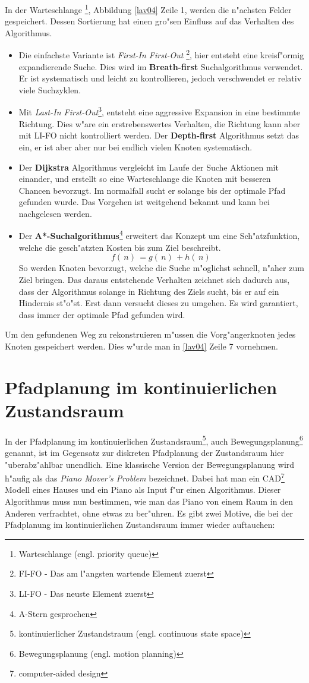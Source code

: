 In der Warteschlange \footnote{Warteschlange (engl. priority queue)}, Abbildung \ref{lav04} Zeile 1, werden die n"achsten Felder gespeichert. Dessen Sortierung hat einen gro"sen Einfluss auf das Verhalten des Algorithmus. 
	\begin{itemize}
		\item Die einfachste Variante ist \textit{First-In First-Out} \footnote{FI-FO - Das am l"angsten wartende Element zuerst}, hier entsteht eine kreisf"ormig expandierende Suche. Dies wird im \textbf{Breath-first} Suchalgorithmus verwendet. Er ist systematisch und leicht zu kontrollieren, jedoch verschwendet er relativ viele Suchzyklen.\cite[~S. 35]{Lav06}
		\item Mit \textit{Last-In First-Out}\footnote{LI-FO - Das neuste Element zuerst}, entsteht eine aggressive Expansion in eine bestimmte Richtung. 
		Dies w"are ein erstrebenswertes Verhalten, die Richtung kann aber mit LI-FO nicht kontrolliert werden. Der \textbf{Depth-first} Algorithmus setzt das ein, er ist aber aber nur bei endlich vielen Knoten systematisch. \cite[~S. 36]{Lav06}
		\item Der \textbf{Dijkstra} Algorithmus vergleicht im Laufe der Suche Aktionen mit einander, und erstellt so eine Warteschlange die Knoten mit besseren Chancen bevorzugt. Im normalfall sucht er solange bis der optimale Pfad gefunden wurde. Das Vorgehen ist weitgehend bekannt und kann bei \cite[~S. 36]{Lav06} nachgelesen werden.
		\item Der \textbf{A*-Suchalgorithmus}\footnote{A-Stern gesprochen} erweitert das Konzept um eine Sch"atzfunktion, welche die gesch"atzten Kosten bis zum Ziel beschreibt.
		$$f( \, n ) \, = g ( \, n ) \, + h ( \, n ) \,$$
		So werden Knoten bevorzugt, welche die Suche m"oglichst schnell, n"aher zum Ziel bringen. Das daraus entstehende Verhalten zeichnet sich dadurch aus, dass der Algorithmus solange in Richtung des Ziels sucht, bis er auf ein Hindernis st"o"st. Erst dann versucht dieses zu umgehen. Es wird garantiert, dass immer der optimale Pfad gefunden wird.\cite[~S. 37]{Lav06}
	\end{itemize}
Um den gefundenen Weg zu rekonstruieren m"ussen die Vorg"angerknoten jedes Knoten gespeichert werden. Dies w"urde man in \ref{lav04} Zeile 7 vornehmen. 


\section{Pfadplanung im kontinuierlichen Zustandsraum}
In der Pfadplanung im kontinuierlichen Zustandsraum\footnote{kontinuierlicher Zustandstraum (engl. continuous state space)}, auch Bewegungsplanung\footnote{Bewegungsplanung (engl. motion planning)} genannt, ist im Gegensatz zur diskreten Pfadplanung der Zustandsraum hier "uberabz"ahlbar unendlich.
Eine klassische Version der Bewegungsplanung wird h"aufig als das \textit{Piano Mover's Problem} bezeichnet. Dabei hat man ein CAD\footnote{computer-aided design} Modell eines Hauses und ein Piano als Input f"ur einen Algorithmus. Dieser Algorithmus muss nun bestimmen, wie man das Piano von einem Raum in den Anderen verfrachtet, ohne etwas zu ber"uhren. 
Es gibt zwei Motive, die bei der Pfadplanung im kontinuierlichen Zustandsraum immer wieder auftauchen:
